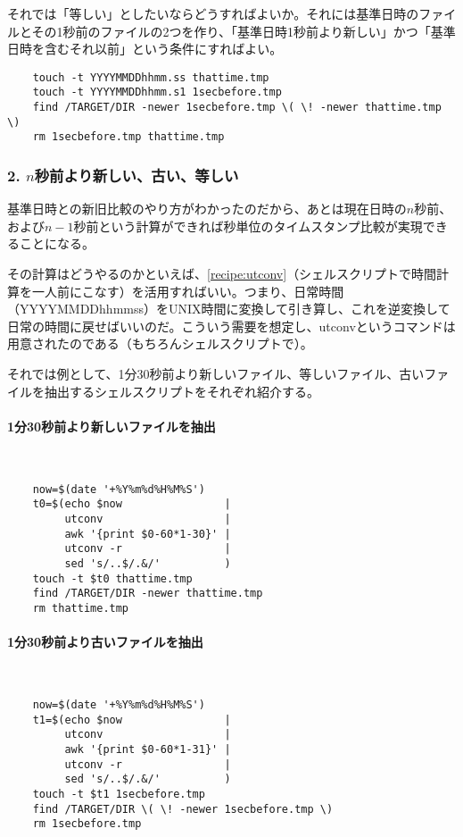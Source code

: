 それでは「等しい」としたいならどうすればよいか。それには基準日時のファイルとその1秒前のファイルの2つを作り、「基準日時1秒前より新しい」かつ「基準日時を含むそれ以前」という条件にすればよい。\\
\begin{frameboxit}{160.0mm}
\begin{verbatim}
	touch -t YYYYMMDDhhmm.ss thattime.tmp
	touch -t YYYYMMDDhhmm.s1 1secbefore.tmp
	find /TARGET/DIR -newer 1secbefore.tmp \( \! -newer thattime.tmp \)
	rm 1secbefore.tmp thattime.tmp
\end{verbatim}
\end{frameboxit}

\subsubsection*{2. $n$秒前より新しい、古い、等しい}

基準日時との新旧比較のやり方がわかったのだから、あとは現在日時の$n$秒前、および$n-1$秒前という計算ができれば秒単位のタイムスタンプ比較が実現できることになる。

その計算はどうやるのかといえば、\ref{recipe:utconv}（シェルスクリプトで時間計算を一人前にこなす）を活用すればいい。つまり、日常時間（YYYYMMDDhhmmss）をUNIX時間に変換して引き算し、これを逆変換して日常の時間に戻せばいいのだ。こういう需要を想定し、utconvというコマンドは用意されたのである（もちろんシェルスクリプトで）。

それでは例として、1分30秒前より新しいファイル、等しいファイル、古いファイルを抽出するシェルスクリプトをそれぞれ紹介する。

\paragraph{1分30秒前より新しいファイルを抽出}　\\
\begin{frameboxit}{160.0mm}
\begin{verbatim}
	now=$(date '+%Y%m%d%H%M%S')
	t0=$(echo $now                |
	     utconv                   |
	     awk '{print $0-60*1-30}' |
	     utconv -r                |
	     sed 's/..$/.&/'          )
	touch -t $t0 thattime.tmp
	find /TARGET/DIR -newer thattime.tmp
	rm thattime.tmp
\end{verbatim}
\end{frameboxit}

\paragraph{1分30秒前より古いファイルを抽出}　\\
\begin{frameboxit}{160.0mm}
\begin{verbatim}
	now=$(date '+%Y%m%d%H%M%S')
	t1=$(echo $now                |
	     utconv                   |
	     awk '{print $0-60*1-31}' |
	     utconv -r                |
	     sed 's/..$/.&/'          )
	touch -t $t1 1secbefore.tmp
	find /TARGET/DIR \( \! -newer 1secbefore.tmp \)
	rm 1secbefore.tmp
\end{verbatim}
\end{frameboxit}

